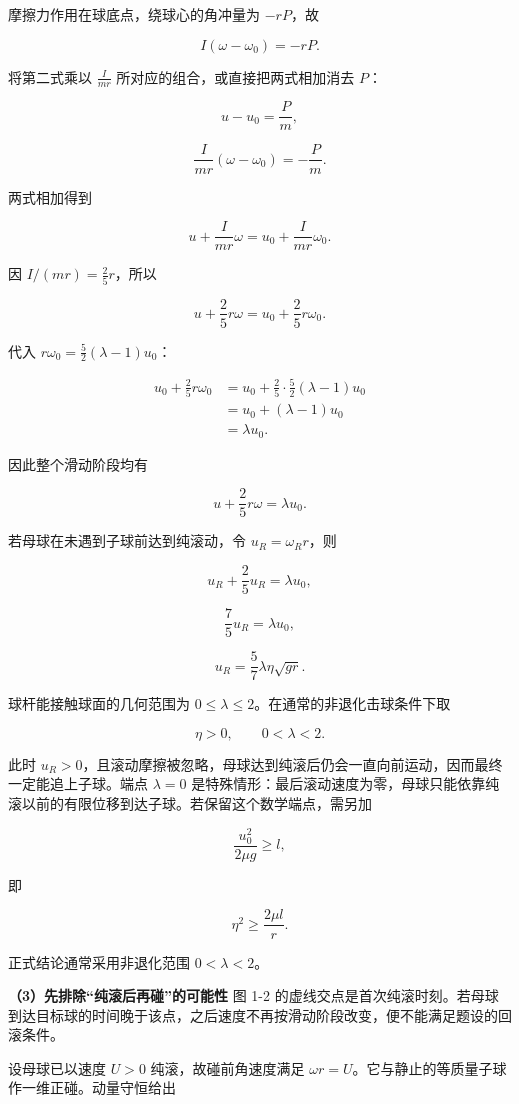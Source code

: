 \documentclass[12pt,a4paper,UTF8]{ctexart}
\begin{document}
摩擦力作用在球底点，绕球心的角冲量为 \(-rP\)，故

\[I(\omega-\omega_0)=-rP.\]

将第二式乘以 \(\frac{I}{mr}\) 所对应的组合，或直接把两式相加消去 \(P\)：

\[u-u_0=\frac Pm,\]

\[\frac{I}{mr}(\omega-\omega_0)=-\frac Pm.\]

两式相加得到

\[u+\frac{I}{mr}\omega=u_0+\frac{I}{mr}\omega_0.\]

因 \(I/(mr)=\frac25r\)，所以

\[\boxed{u+\frac25r\omega=u_0+\frac25r\omega_0}.\]

代入 \(r\omega_0=\frac52(\lambda-1)u_0\)：

\[\begin{aligned}
u_0+\frac25r\omega_0
&=u_0+\frac25\cdot\frac52(\lambda-1)u_0\\
&=u_0+(\lambda-1)u_0\\
&=\lambda u_0.
\end{aligned}\]

因此整个滑动阶段均有

\[\boxed{u+\frac25r\omega=\lambda u_0}.\]

若母球在未遇到子球前达到纯滚动，令 \(u_R=\omega_Rr\)，则

\[u_R+\frac25u_R=\lambda u_0,\]

\[\frac75u_R=\lambda u_0,\]

\[\boxed{u_R=\frac57\lambda\eta\sqrt{gr}}.\]

球杆能接触球面的几何范围为
\(0\le\lambda\le2\)。在通常的非退化击球条件下取

\[\boxed{\eta>0,\qquad 0<\lambda<2}.\]

此时
\(u_R>0\)，且滚动摩擦被忽略，母球达到纯滚后仍会一直向前运动，因而最终一定能追上子球。端点
\(\lambda=0\)
是特殊情形：最后滚动速度为零，母球只能依靠纯滚以前的有限位移到达子球。若保留这个数学端点，需另加

\[\frac{u_0^2}{2\mu g}\ge l,\]

即

\[\eta^2\ge\frac{2\mu l}{r}.\]

正式结论通常采用非退化范围 \(0<\lambda<2\)。

\textbf{（3）先排除``纯滚后再碰''的可能性} 图 1-2
的虚线交点是首次纯滚时刻。若母球到达目标球的时间晚于该点，之后速度不再按滑动阶段改变，便不能满足题设的回滚条件。

设母球已以速度 \(U>0\) 纯滚，故碰前角速度满足
\(\omega r=U\)。它与静止的等质量子球作一维正碰。动量守恒给出
\end{document}
